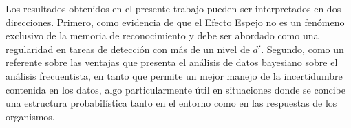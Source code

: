 Los resultados obtenidos en el presente trabajo pueden ser interpretados en dos direcciones. Primero, como evidencia de que el Efecto Espejo no es un fenómeno exclusivo de la memoria de reconocimiento y debe ser abordado como una regularidad en tareas de detección con más de un nivel de $d'$. Segundo, como un referente sobre las ventajas que presenta el análisis de datos bayesiano sobre el análisis frecuentista, en tanto que permite un mejor manejo de la incertidumbre contenida en los datos, algo particularmente útil en situaciones donde se concibe una estructura probabilística tanto en el entorno como en las respuestas de los organismos.\\
